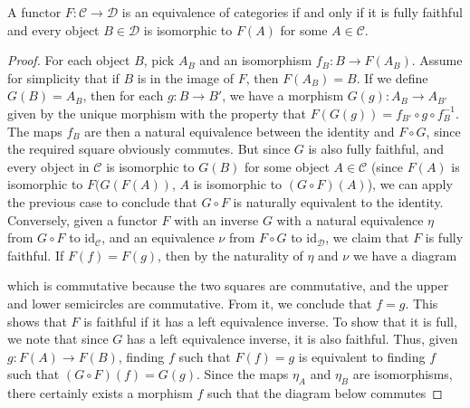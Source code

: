\begin{theorem}
    A functor $F: \mathcal{C} \to \mathcal{D}$ is an equivalence of categories if and only if it is fully faithful and every object $B \in \mathcal{D}$ is isomorphic to $F(A)$ for some $A \in \mathcal{C}$.
\end{theorem}
\begin{proof}
    For each object $B$, pick $A_B$ and an isomorphism $f_B: B \to F(A_B)$. Assume for simplicity that if $B$ is in the image of $F$, then $F(A_B) = B$. If we define $G(B) = A_B$, then for each $g: B \to B'$, we have a morphism $G(g): A_B \to A_{B'}$ given by the unique morphism with the property that $F(G(g)) = f_{B'} \circ g \circ f_B^{-1}$. The maps $f_B$ are then a natural equivalence between the identity and $F \circ G$, since the required square obviously commutes. But since $G$ is also fully faithful, and every object in $\mathcal{C}$ is isomorphic to $G(B)$ for some object $A \in \mathcal{C}$ (since $F(A)$ is isomorphic to $F(G(F(A))$, $A$ is isomorphic to $(G \circ F)(A)$), we can apply the previous case to conclude that $G \circ F$ is naturally equivalent to the identity. Conversely, given a functor $F$ with an inverse $G$ with a natural equivalence $\eta$ from $G \circ F$ to $\text{id}_{\mathcal{C}}$, and an equivalence $\nu$ from $F \circ G$ to $\text{id}_{\mathcal{D}}$, we claim that $F$ is fully faithful. If $F(f) = F(g)$, then by the naturality of $\eta$ and $\nu$ we have a diagram
    \begin{center}
    \end{center}
    which is commutative because the two squares are commutative, and the upper and lower semicircles are commutative. From it, we conclude that $f = g$. This shows that $F$ is faithful if it has a left equivalence inverse. To show that it is full, we note that since $G$ has a left equivalence inverse, it is also faithful. Thus, given $g: F(A) \to F(B)$, finding $f$ such that $F(f) = g$ is equivalent to finding $f$ such that $(G \circ F)(f) = G(g)$. Since the maps $\eta_A$ and $\eta_B$ are isomorphisms, there certainly exists a morphism $f$ such that the diagram below commutes

\end{proof}
